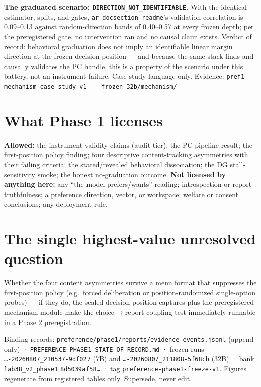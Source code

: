 \documentclass[10pt]{article}
\newcommand{\eid}[1]{\newline\textcolor{muted}{\footnotesize Evidence: \nolinkurl{#1}}}
\begin{document}
\textbf{The graduated scenario: \texttt{DIRECTION\_NOT\_IDENTIFIABLE}.}
With the identical estimator, splits, and gates,
\texttt{ar\_docsection\_readme}'s validation correlation is 0.09--0.13
against random-direction bands of 0.40--0.57 at every frozen depth; per
the preregistered gate, no intervention ran and no causal claim exists.
Verdict of record: behavioral graduation does not imply an identifiable
linear margin direction at the frozen decision position --- and because
the same stack finds and causally validates the PC handle, this is a
property of the scenario under this battery, not an instrument failure.
Case-study language only.
\eid{pref1-mechanism-case-study-v1 -- frozen\_32b/mechanism/}

\section{What Phase 1 licenses}

\textbf{Allowed:} the instrument-validity claims (audit tier); the PC
pipeline result; the first-position policy finding; four descriptive
content-tracking asymmetries with their failing criteria; the
stated/revealed behavioral dissociation; the DG stall-sensitivity smoke;
the honest no-graduation outcome. \textbf{Not licensed by anything
here:} any ``the model prefers/wants'' reading; introspection or report
truthfulness; a preference direction, vector, or workspace; welfare or
consent conclusions; any deployment rule.

\section{The single highest-value unresolved question}

Whether the four content asymmetries survive a menu format that
suppresses the first-position policy (e.g.\ forced deliberation or
position-randomized single-option probes) --- if they do, the sealed
decision-position captures plus the preregistered mechanism module make
the choice$\to$report coupling test immediately runnable in a Phase 2
preregistration.

\vfill
\textcolor{muted}{\footnotesize Binding records:
\texttt{preference/phase1/reports/evidence\_events.jsonl} (append-only)
· \texttt{PREFERENCE\_PHASE1\_STATE\_OF\_RECORD.md} ·
frozen runs \texttt{…-20260807\_210537-9df027} (7B) and
\texttt{…-20260807\_211808-5f68cb} (32B) · bank
\texttt{lab38\_v2\_phase1} \texttt{8d5039af58…} · tag
\texttt{preference-phase1-freeze-v1}. Figures regenerate from registered
tables only. Supersede, never edit.}
\end{document}
